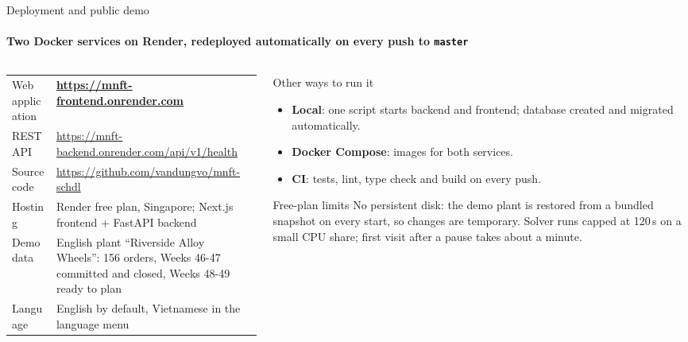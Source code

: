 \begin{frame}{Deployment and public demo}
\framesubtitle{Two Docker services on Render, redeployed automatically on every push to \texttt{master}}
\begin{columns}[T]
\begin{column}{0.55\textwidth}
\tiny
\renewcommand{\arraystretch}{1.25}
\begin{tabular}{@{}L{1.95cm}L{5.6cm}@{}}
\toprule
Web application & \textbf{\url{https://mnft-frontend.onrender.com}}\\
REST API & \url{https://mnft-backend.onrender.com/api/v1/health}\\
Source code & \url{https://github.com/vandungvo/mnft-schdl}\\
Hosting & Render free plan, Singapore; Next.js frontend + FastAPI backend\\
Demo data & English plant ``Riverside Alloy Wheels'': 156 orders, Weeks 46-47 committed and closed, Weeks 48-49 ready to plan\\
Language & English by default, Vietnamese in the language menu\\
\bottomrule
\end{tabular}
\end{column}
\begin{column}{0.42\textwidth}
\begin{block}{Other ways to run it}
\scriptsize
\begin{itemize}\setlength{\itemsep}{0.15em}
  \item \textbf{Local}: one script starts backend and frontend; database created and migrated automatically.
  \item \textbf{Docker Compose}: images for both services.
  \item \textbf{CI}: tests, lint, type check and build on every push.
\end{itemize}
\end{block}
\vspace{-0.2em}
\begin{alertblock}{Free-plan limits}
\scriptsize
No persistent disk: the demo plant is restored from a bundled snapshot on every start, so changes are temporary.
Solver runs capped at 120\,s on a small CPU share; first visit after a pause takes about a minute.
\end{alertblock}
\end{column}
\end{columns}
\end{frame}

